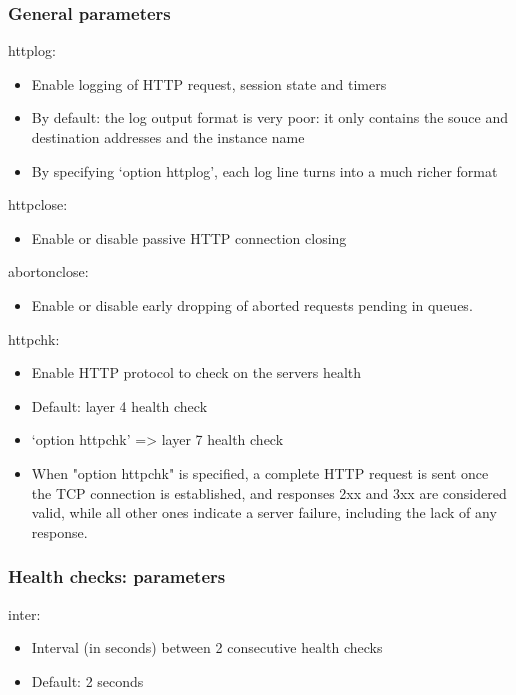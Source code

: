 \documentclass{article}
\begin{document}
\subsubsection{General parameters}

httplog:

\begin{itemize}
    \item Enable logging of HTTP request, session state and timers
    \item By default: the log output format is very poor: it only contains the souce and destination addresses and the instance name
    \item By specifying `option httplog', each log line turns into a much richer format
\end{itemize}

httpclose:

\begin{itemize}
    \item Enable or disable passive HTTP connection closing
\end{itemize}

abortonclose:

\begin{itemize}
    \item Enable or disable early dropping of aborted requests pending in queues.
\end{itemize}

httpchk:

\begin{itemize}
    \item Enable HTTP protocol to check on the servers health
    \item Default: layer 4 health check
    \item `option httpchk' => layer 7 health check
    \item When "option httpchk" is specified, a complete HTTP request is sent once the TCP connection is established, 
        and responses 2xx and 3xx are considered valid, while all other ones indicate a server failure, 
        including the lack of any response.
\end{itemize}

\subsubsection{Health checks: parameters}

inter:

\begin{itemize}
    \item Interval (in seconds) between 2 consecutive health checks
    \item Default: 2 seconds
\end{itemize}
\end{document}
